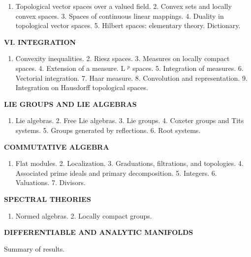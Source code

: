 \begin{enumerate}
\def\labelenumi{\arabic{enumi}.}
\tightlist
\item
  Topological vector spaces over a valued field. 2. Convex sets and locally convex spaces. 3. Spaces of continuous linear mappings. 4. Duality in topological vector spaces. 5. Hilbert spaces: elementary theory. Dictionary.
\end{enumerate}

\textbf{VI. INTEGRATION}\par

\begin{enumerate}
\def\labelenumi{\arabic{enumi}.}
\tightlist
\item
  Convexity inequalities. 2. Riesz spaces. 3. Measures on locally compact spaces. 4. Extension of a measure. L \(^{p}\) spaces. 5. Integration of measures. 6. Vectorial integration. 7. Haar measure. 8. Convolution and representation. 9. Integration on Hausdorff topological spaces.
\end{enumerate}


\textbf{LIE GROUPS AND LIE ALGEBRAS}\par

\begin{enumerate}
\def\labelenumi{\arabic{enumi}.}
\tightlist
\item
  Lie algebras. 2. Free Lie algebras. 3. Lie groups. 4. Coxeter groups and Tits systems. 5. Groups generated by reflections. 6. Root systems.
\end{enumerate}

\textbf{COMMUTATIVE ALGEBRA}\par

\begin{enumerate}
\def\labelenumi{\arabic{enumi}.}
\tightlist
\item
  Flat modules. 2. Localization. 3. Graduations, filtrations, and topologies. 4. Associated prime ideals and primary decomposition. 5. Integers. 6. Valuations. 7. Divisors.
\end{enumerate}

\textbf{SPECTRAL THEORIES}\par

\begin{enumerate}
\def\labelenumi{\arabic{enumi}.}
\tightlist
\item
  Normed algebras. 2. Locally compact groups.
\end{enumerate}

\textbf{DIFFERENTIABLE AND ANALYTIC MANIFOLDS}\par

Summary of results.

